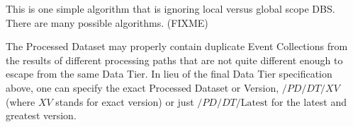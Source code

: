 This is one simple algorithm that is ignoring local versus global scope DBS.  
There are many possible algorithms.  (FIXME)


The Processed Dataset may properly contain duplicate Event Collections from
the results of different processing paths that are not quite different
enough to escape from the same Data Tier. In lieu of the final Data
Tier specification above, one can specify the exact Processed Dataset
or Version, $/PD/DT/XV$ (where $XV$ stands for exact version) or just
$/PD/DT/\mbox{Latest}$ for the latest and greatest version.

